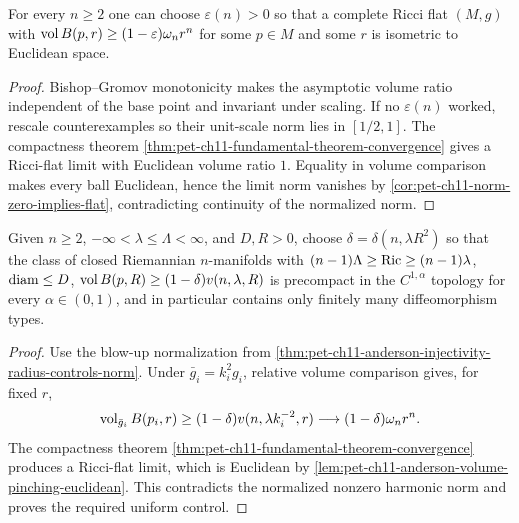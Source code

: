 \begin{lemma}
  \label{lem:pet-ch11-anderson-volume-pinching-euclidean}

  For every $n\ge2$ one can choose $\varepsilon(n)>0$ so that a complete Ricci
  flat $(M,g)$ with $\operatorname{vol} B(p,r)\ge(1-\varepsilon)\omega_nr^n$ for some
  $p\in M$ and some $r$ is isometric to Euclidean space.
\end{lemma}
\begin{proof}
  \sketch
  Bishop--Gromov monotonicity makes the asymptotic volume ratio independent of the base point and invariant under scaling. If no \(\varepsilon(n)\) worked, rescale counterexamples so their unit-scale norm lies in \([1/2,1]\). The compactness theorem \cref{thm:pet-ch11-fundamental-theorem-convergence} gives a Ricci-flat limit with Euclidean volume ratio \(1\). Equality in volume comparison makes every ball Euclidean, hence the limit norm vanishes by \cref{cor:pet-ch11-norm-zero-implies-flat}, contradicting continuity of the normalized norm.
\end{proof}


\begin{corollary}
  \label{cor:pet-ch11-volume-pinching-precompactness}

  Given $n\ge2$, $-\infty<\lambda\le\Lambda<\infty$, and $D,R>0$, choose
  $\delta=\delta(n,\lambda R^2)$ so that the class of closed Riemannian
  $n$-manifolds with $(n-1)\Lambda\ge\operatorname{Ric}\ge(n-1)\lambda$, $\operatorname{diam}\le D$,
  $\operatorname{vol} B(p,R)\ge(1-\delta)v(n,\lambda,R)$ is precompact in the $C^{1,\alpha}$
  topology for every $\alpha\in(0,1)$, and in particular contains only
  finitely many diffeomorphism types.
\end{corollary}
\begin{proof}
  \sketch
  Use the blow-up normalization from \cref{thm:pet-ch11-anderson-injectivity-radius-controls-norm}. Under \(\bar g_i=k_i^2g_i\), relative volume comparison gives, for fixed \(r\),
  \[
    \operatorname{vol}_{\bar g_i}B(p_i,r)\ge(1-\delta)v(n,\lambda k_i^{-2},r)
      \longrightarrow(1-\delta)\omega_nr^n .
  \]
  The compactness theorem \cref{thm:pet-ch11-fundamental-theorem-convergence} produces a Ricci-flat limit, which is Euclidean by \cref{lem:pet-ch11-anderson-volume-pinching-euclidean}. This contradicts the normalized nonzero harmonic norm and proves the required uniform control.
\end{proof}


